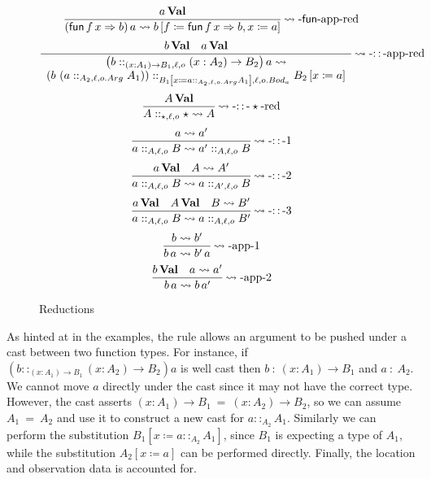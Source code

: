 \begin{figure}
\[
\frac{a\,\textbf{Val}}{\left(\mathsf{fun}\,f\,x\Rightarrow b\right)a\rightsquigarrow b\left[f\coloneqq\mathsf{fun}\,f\,x\Rightarrow b,x\coloneqq a\right]}
\operatorname{\rightsquigarrow-\mathsf{fun}-app-red}
\]
\[
\frac{b\,\textbf{Val}\quad a\,\textbf{Val}}{\begin{array}{c}
\left(b::_{\left(x:A_{1}\right)\rightarrow B_{1},\ell ,o}\left(x:A_{2}\right)\rightarrow B_{2}\right)a\rightsquigarrow\\
\left(b\,\left(a::_{A_{2},\ell,o.Arg}A_{1}\right)\right)::_{B_{1}\left[x\coloneqq a::_{A_{2},\ell,o.Arg}A_{1}\right],\ell ,o.Bod_a}B_{2}\left[x\coloneqq a\right]
\end{array}}
\operatorname{\rightsquigarrow-::-app-red}
\]
\[
\frac{A\,\textbf{Val}}{A::_{\star,\ell ,o}\star\rightsquigarrow A}
\operatorname{\rightsquigarrow-::-\star-red}
\]
\[
\frac{a\rightsquigarrow a'}{a::_{A,\ell ,o}B\rightsquigarrow a'::_{A,\ell ,o}B}
\operatorname{\rightsquigarrow-::-1}
\]
\[
\frac{a\,\textbf{Val}\quad A\rightsquigarrow A'}{a::_{A,\ell ,o}B\rightsquigarrow a::_{A',\ell ,o}B}
\operatorname{\rightsquigarrow-::-2}
\]
\[
\frac{a\,\textbf{Val}\quad A\,\textbf{Val}\quad B\rightsquigarrow B'}{a::_{A,\ell ,o}B\rightsquigarrow a::_{A,\ell ,o}B'}
\operatorname{\rightsquigarrow-::-3}
\]
\[
\frac{b\rightsquigarrow b'}{b\,a\rightsquigarrow b'\,a}
\operatorname{\rightsquigarrow-app-1}
\]
\[
\frac{b\,\textbf{Val}\quad a\rightsquigarrow a'}{b\,a\rightsquigarrow b\,a'}
\operatorname{\rightsquigarrow-app-2}
\]
 
\caption{\CLang{} \CbV{} Reductions}
\label{fig:cast-step}
\end{figure}

As hinted at in the examples, the  rule allows an argument to be pushed under a cast between two function types.
For instance, if $\left(b::_{\left(x:A_{1}\right)\rightarrow B_{1}}\left(x:A_{2}\right)\rightarrow B_{2}\right)a$ is well cast then $b\ :\ \left(x:A_{1}\right)\rightarrow B_{1}$ and $a\ :\ A_{2}$.
We cannot move $a$ directly under the cast since it may not have the correct type. 
However, the cast asserts $\left(x:A_{1}\right)\rightarrow B_{1}\ =\ \left(x:A_{2}\right)\rightarrow B_{2}$, so we can assume $A_{1}\ =\ A_{2}$ and use it to construct a new cast for $a::_{A_{2}}A_{1}$.
Similarly we can perform the substitution $B_{1}[x\coloneqq a::_{A_{2}}A_{1}]$, since $B_{1}$ is expecting a type of $A_{1}$, while the substitution $A_{2}[x\coloneqq a]$ can be performed directly.
Finally, the location and observation data is accounted for.

